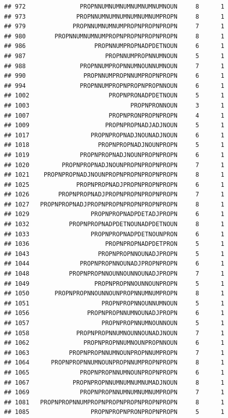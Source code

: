 \documentclass[]{article}
\begin{document}
\begin{verbatim}
## 972               PROPNNUMNUMNUMNUMNUMNUMNOUN     8      1
## 973              PROPNNUMNUMNUMNUMNUMNUMPROPN     8      1
## 979             PROPNNUMNUMNUMPROPNPROPNPROPN     7      1
## 980        PROPNNUMNUMNUMPROPNPROPNPROPNPROPN     8      1
## 986                   PROPNNUMPROPNADPDETNOUN     6      1
## 987                      PROPNNUMPROPNNUMNOUN     5      1
## 988               PROPNNUMPROPNNUMNOUNNUMNOUN     7      1
## 990                PROPNNUMPROPNNUMPROPNPROPN     6      1
## 994               PROPNNUMPROPNPROPNPROPNNOUN     6      1
## 1002                      PROPNPRONADPDETNOUN     5      1
## 1003                            PROPNPRONNOUN     3      1
## 1007                      PROPNPRONPROPNPROPN     4      1
## 1009                     PROPNPROPNADJADJNOUN     5      1
## 1017                 PROPNPROPNADJNOUNADJNOUN     6      1
## 1018                   PROPNPROPNADJNOUNPROPN     5      1
## 1019              PROPNPROPNADJNOUNPROPNPROPN     6      1
## 1020         PROPNPROPNADJNOUNPROPNPROPNPROPN     7      1
## 1021    PROPNPROPNADJNOUNPROPNPROPNPROPNPROPN     8      1
## 1025             PROPNPROPNADJPROPNPROPNPROPN     6      1
## 1026        PROPNPROPNADJPROPNPROPNPROPNPROPN     7      1
## 1027   PROPNPROPNADJPROPNPROPNPROPNPROPNPROPN     8      1
## 1029                 PROPNPROPNADPDETADJPROPN     6      1
## 1032           PROPNPROPNADPDETNOUNADPDETNOUN     8      1
## 1033                 PROPNPROPNADPDETNOUNPRON     6      1
## 1036                     PROPNPROPNADPDETPRON     5      1
## 1043                   PROPNPROPNNOUNADJPROPN     5      1
## 1044              PROPNPROPNNOUNADJPROPNPROPN     6      1
## 1048           PROPNPROPNNOUNNOUNNOUNADJPROPN     7      1
## 1049                  PROPNPROPNNOUNNOUNPROPN     5      1
## 1050       PROPNPROPNNOUNNOUNPROPNNUMNUMPROPN     8      1
## 1051                    PROPNPROPNNOUNNUMNOUN     5      1
## 1056                PROPNPROPNNUMNOUNADJPROPN     6      1
## 1057                    PROPNPROPNNUMNOUNNOUN     5      1
## 1058             PROPNPROPNNUMNOUNNOUNADJNOUN     7      1
## 1062               PROPNPROPNNUMNOUNPROPNNOUN     6      1
## 1063           PROPNPROPNNUMNOUNPROPNNUMPROPN     7      1
## 1064      PROPNPROPNNUMNOUNPROPNNUMPROPNPROPN     8      1
## 1065              PROPNPROPNNUMNOUNPROPNPROPN     6      1
## 1067            PROPNPROPNNUMNUMNUMNUMADJNOUN     8      1
## 1069              PROPNPROPNNUMNUMNUMNUMPROPN     7      1
## 1081   PROPNPROPNNUMPROPNPROPNPROPNPROPNPROPN     8      1
## 1085                 PROPNPROPNPRONPROPNPROPN     5      1

\end{verbatim}
\end{document}
